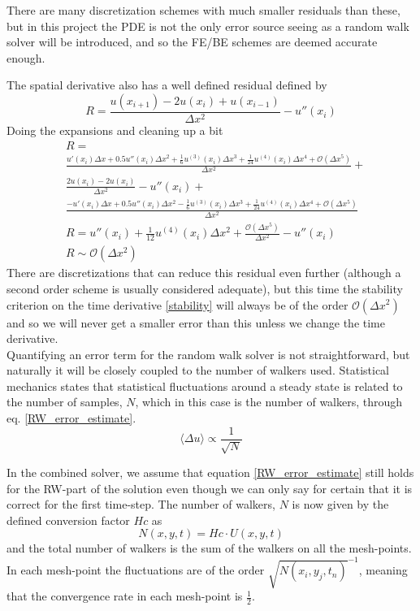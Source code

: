 There are many discretization schemes with much smaller residuals than these, but in this project the PDE is not the only error source seeing as a random walk solver will be introduced, and so the FE/BE schemes are deemed accurate enough.

The spatial derivative also has a well defined residual defined by
\begin{equation}
R = \frac{u(x_{i+1})-2u(x_i)+u(x_{i-1})}{\Delta x^2}-u''(x_i) 
\end{equation}
Doing the expansions and cleaning up a bit 
\begin{align*}
 &R =\\& \frac{u'(x_i)\Delta x +0.5u''(x_i)\Delta x^2 + \frac{1}{6}u^{(3)}(x_i)\Delta x^3 +\frac{1}{24}u^{(4)}(x_i)\Delta x^4 +\mathcal{O}(\Delta x^5)}{\Delta x^2}+\\ &\frac{2u(x_i)-2u(x_i)}{\Delta x^2} -u''(x_i) +\\
 &\frac{-u'(x_i)\Delta x +0.5u''(x_i)\Delta x^2 - \frac{1}{6}u^{(3)}(x_i)\Delta x^3 +\frac{1}{24}u^{(4)}(x_i)\Delta x^4 +\mathcal{O}(\Delta x^5)}{\Delta x^2} \\
&R = u''(x_i) +\frac{1}{12}u^{(4)}(x_i)\Delta x^2 + \frac{\mathcal{O}(\Delta x^5)}{\Delta x^2}  -u''(x_i) \\
&R\sim \mathcal{O}(\Delta x^2) 
\end{align*}
There are discretizations that can reduce this residual even further (although a second order scheme is usually considered adequate), but this time the stability criterion on the time derivative \ref{stability} will always be of the order $\mathcal{O}(\Delta x^2)$ and so we will never get a smaller error than this unless we change the time derivative. \\


Quantifying an error term for the random walk solver is not straightforward, but naturally it will be closely coupled to the number of walkers used. 
Statistical mechanics states that statistical fluctuations around a steady state is related to the number of samples, $N$, which in this case is the number of walkers, through eq. \eqref{RW_error_estimate}.
\begin{equation}\label{RW_error_estimate}
 \langle\Delta u\rangle \propto \frac{1}{\sqrt{N}}
\end{equation}

In the combined solver, we assume that equation \ref{RW_error_estimate} still holds for the RW-part of the solution even though we can only say for certain that it is correct for the first time-step. 
The number of walkers, $N$ is now given by the defined conversion factor $Hc$ as 
\begin{equation}
 N(x,y,t) = Hc\cdot U(x,y,t)
\end{equation}
and the total number of walkers is the sum of the walkers on all the mesh-points. 
In each mesh-point the fluctuations are of the order $\sqrt{N(x_i,y_j,t_n)}^{-1}$, meaning that the convergence rate in each mesh-point is $\frac{1}{2}$.

